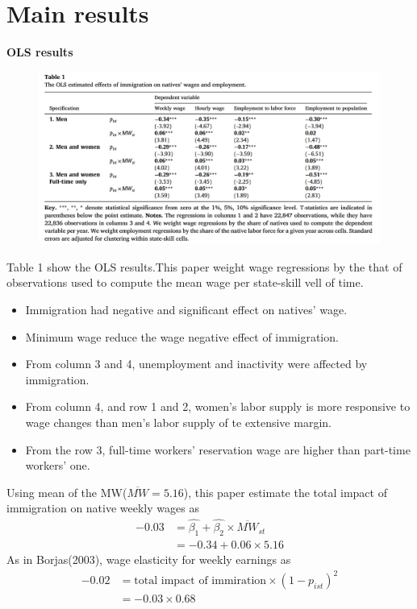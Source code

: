 \documentclass[../root]{subfiles}
\begin{document}
    \section{Main results}
    {\bf OLS results} \\
    \begin{figure}[h]
        \includegraphics[width=12cm]{0612sugiyama/Table1.png}
    \end{figure}
    Table 1 show the OLS results.This paper weight wage regressions by the that of observations used to compute the mean wage per state-skill vell of time.

    \begin{itemize}
        \item Immigration had negative and significant effect on natives' wage.
        \item Minimum wage reduce the wage negative effect of immigration.
        \item From column 3 and 4, unemployment and inactivity were affected by immigration.
        \item From column 4, and row 1 and 2, women's labor supply is  more responsive to wage changes than men's labor supply of te extensive margin. 
        \item From the row 3, full-time workers' reservation wage are higher than part-time workers' one.
    \end{itemize}
    

    Using mean of the MW($\overline{MW}= 5.16 $), this paper estimate the total impact of immigration on native weekly wages as
    \begin{align*}
        -0.03&= \hat{\beta_1} + \hat{\beta_2} \times \overline{MW}_{st} \\
            &= -0.34+0.06 \times 5.16 
    \end{align*}
    As in Borjas(2003), wage elasticity for weekly earnings as 
    \begin{align*}
        -0.02 &= \mbox{total impact of immiration} \times (1-p_{ist})^2 \\
            &=-0.03 \times 0.68 
    \end{align*}
\end{document}
